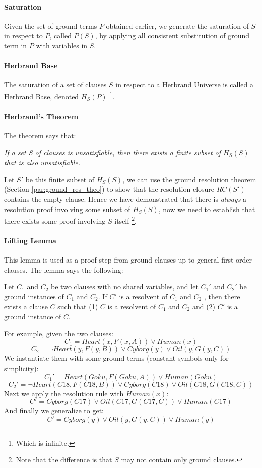 \documentclass[10pt,a4paper]{article}
\begin{document}
\paragraph{Saturation} Given the set of ground terms $P$ obtained earlier, we generate the saturation of $S$ in respect to $P$, called $P(S)$, by applying all consistent substitution of ground term in $P$ with variables in $S$.

\paragraph{Herbrand Base}
\label{sec:herbrand_base}
The saturation of a set of clauses $S$ in respect to a Herbrand Universe is called a Herbrand Base, denoted $H_S(P)$ \footnote{Which is infinite.}.

\paragraph{Herbrand's Theorem}
The theorem says that:
\begin{center}
\textit{If a set S of clauses is unsatisfiable, then there exists a finite subset of $H_S(S)$ that
is also unsatisfiable.}
\end{center}
Let $S'$ be this finite subset of $H_S(S)$, we can use the ground resolution theorem (Section \ref{par:ground_res_theo}) to show that the resolution closure $RC(S')$ contains the empty clause. Hence we have demonstrated that there is \textit{always} a resolution proof involving some subset of $H_S(S)$, now we need to establish that there exists some proof involving $S$ itself \footnote{Note that the difference is that $S$ may not contain only ground clauses.}.

\paragraph{Lifting Lemma}
This lemma is used as a proof step from ground clauses up to general first-order clauses. The lemma says the following:
\begin{center}
    Let $C_1$ and $C_2$ be two clauses with no shared variables, and let $C_1'$ and $C_2'$ be ground instances of $C_1$ and $C_2$. If $C'$ is a resolvent of $C_1$ and $C_2$ , then there exists a clause $C$ such that (1) $C$ is a resolvent of $C_1$ and $C_2$ and (2) $C'$ is a ground instance of $C$.
\end{center} 
For example, given the two clauses:
\[C_1=Heart(x,F(x,A))\vee Human(x)\]
\[C_2=\neg Heart(y,F(y,B))\vee Cyborg(y)\vee Oil(y,G(y,C))\]
We instantiate them with some ground terms (constant symbols only for simplicity):
\[C_1'=Heart(Goku,F(Goku,A))\vee Human(Goku)\]
\[C_2'=\neg Heart(C18,F(C18,B))\vee Cyborg(C18)\vee Oil(C18,G(C18,C))\]
Next we apply the resolution rule with $Human(x)$:
\[C'=Cyborg(C17)\vee Oil(C17,G(C17,C))\vee Human(C17)\]
And finally we generalize to get:
\[C'=Cyborg(y)\vee Oil(y,G(y,C))\vee Human(y)\]
\end{document}
